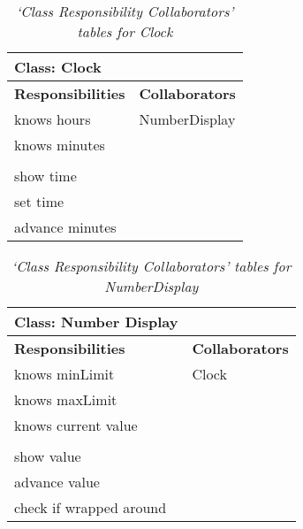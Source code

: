 \documentclass[a4paper,11pt,twoside]{article}
\begin{document}
\begin{table}[!h]
\centering
\caption{\textit{`Class Responsibility Collaborators' tables for Clock}}
\label{tab:crcclock}
\begin{tabular}{l|l}
Class: Clock              &                        \\ \hline
\textbf{Responsibilities} & \textbf{Collaborators} \\
knows hours               & NumberDisplay          \\
knows minutes             &                        \\
                          &                        \\
show time                 &                        \\
set time                  &                        \\
advance minutes           &                       
\end{tabular}
\end{table}

\begin{table}[h]
\centering
\caption{\textit{`Class Responsibility Collaborators' tables for NumberDisplay}}
\label{tab:crcnumberdisplay}
\begin{tabular}{l|l}
Class: Number Display     &                        \\ \hline
\textbf{Responsibilities} & \textbf{Collaborators} \\
knows minLimit            & Clock                  \\
knows maxLimit            &                        \\
knows current value       &                        \\
                          &                        \\
show value                &                        \\
advance value             &                        \\
check if wrapped around   &                       
\end{tabular}
\end{table}
\end{document}
